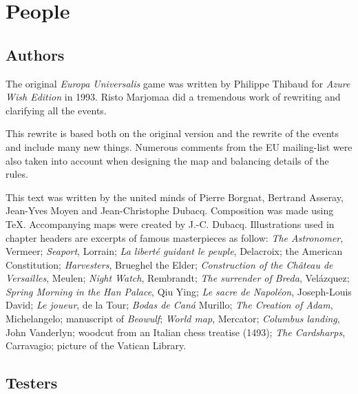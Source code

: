 

\chapter*{People}

\section*{Authors}

The original \emph{Europa Universalis} game was written by Philippe Thibaud
for \emph{Azure Wish Edition} in 1993. Risto Marjomaa did a tremendous work of
rewriting and clarifying all the events.

This rewrite is based both on the original version and the rewrite of the
events and include many new things. Numerous comments from the EU mailing-list
were also taken into account when designing the map and balancing details of
the rules.

This text was written by the united minds of Pierre Borgnat, Bertrand Asseray,
Jean-Yves Moyen and Jean-Christophe Dubacq. Composition was made using
\TeX. Accompanying maps were created by J.-C. Dubacq. Illustrations used in
chapter headers are excerpts of famous masterpieces as follow:
 \emph{The Astronomer}, Vermeer;
\emph{Seaport}, Lorrain;
\emph{La liberté guidant le peuple}, Delacroix;
the American Constitution;
\emph{Harvesters}, Brueghel the Elder;
\emph{Construction of the Château de Versailles}, Meulen;
\emph{Night Watch}, Rembrandt;
\emph{The surrender of Breda}, Velázquez;
\emph{Spring Morning in the Han Palace}, Qiu Ying;
\emph{Le sacre de Napoléon}, Joseph-Louis David;
\emph{Le joueur}, de la Tour;
\emph{Bodas de Caná} Murillo;
\emph{The Creation of Adam}, Michelangelo;
manuscript of \emph{Beowulf};
\emph{World map}, Mercator;
\emph{Columbus landing}, John Vanderlyn; 
woodcut from an Italian chess treatise (1493);
\emph{The Cardsharps}, Carravagio;
picture of the Vatican Library.




\section*{Testers}

